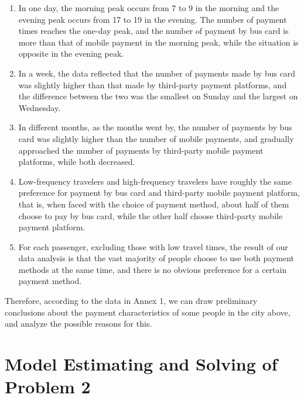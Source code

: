 \documentclass[../mcmpaper]{subfiles}
\begin{document}
\begin{enumerate}[label=\arabic*)]
    \item In one day, the morning peak occurs from 7 to 9 in the morning and the evening peak occurs from 17 to 19 in the evening. The number of payment times reaches the one-day peak, and the number of payment by bus card is more than that of mobile payment in the morning peak, while the situation is opposite in the evening peak.
    \item In a week, the data reflected that the number of payments made by bus card was slightly higher than that made by third-party payment platforms, and the difference between the two was the smallest on Sunday and the largest on Wednesday.
    \item In different months, as the months went by, the number of payments by bus card was slightly higher than the number of mobile payments, and gradually approached the number of payments by third-party mobile payment platforms, while both decreased.
    \item Low-frequency travelers and high-frequency travelers have roughly the same preference for payment by bus card and third-party mobile payment platform, that is, when faced with the choice of payment method, about half of them choose to pay by bus card, while the other half choose third-party mobile payment platform.
    \item For each passenger, excluding those with low travel times, the result of our data analysis is that the vast majority of people choose to use both payment methods at the same time, and there is no obvious preference for a certain payment method.
\end{enumerate}
Therefore, according to the data in Annex 1, we can draw preliminary conclusions about the payment characteristics of some people in the city above, and analyze the possible reasons for this.
\section{Model Estimating and Solving of Problem 2}
\end{document}
